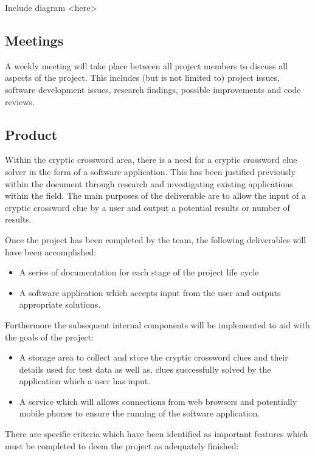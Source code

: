Include diagram <here>


\subsection{Meetings}

A weekly meeting will take place between all project members to discuss all
aspects of the project. This includes (but is not limited to) project issues,
software development issues, research findings, possible improvements and code
reviews.


\subsection{Product}

Within the cryptic crossword area, there is a need for a cryptic crossword clue
solver in the form of a software application.  This has been justified
previously within the document through research and investigating existing
applications within the field. The main purposes of the deliverable are to allow
the input of a cryptic crossword clue by a user and output a potential results
or number of results.

Once the project has been completed by the team, the following deliverables will
have been accomplished:

\begin{itemize}
	\item A series of documentation for each stage of the project life cycle
	\item A software application which accepts input from the user and outputs 
	      appropriate solutions. 
\end{itemize}

Furthermore the subsequent internal components will be implemented to aid with 
the goals of the project:

\begin{itemize}
	\item A storage area to collect and store the cryptic crossword clues and 
	      their details used for test data as well as, clues successfully solved 
	      by the application which a user has input.
	\item A service which will allows connections from web browsers and 
	      potentially mobile phones to ensure the running of the software 
	      application.
\end{itemize}

There are specific criteria which have been identified as important features
which must be completed to deem the project as adequately finished:


